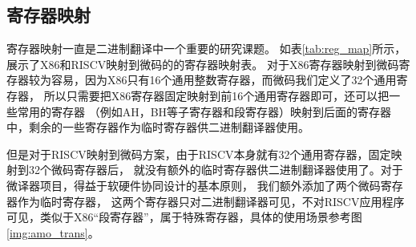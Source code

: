 \subsection{寄存器映射}

寄存器映射一直是二进制翻译中一个重要的研究课题。
如表\ref{tab:reg_map}所示，展示了X86和RISCV映射到微码的的寄存器映射表。
对于X86寄存器映射到微码寄存器较为容易，因为X86只有16个通用整数寄存器，而微码我们定义了32个通用寄存器，
所以只需要把X86寄存器固定映射到前16个通用寄存器即可，还可以把一些常用的寄存器
（例如AH，BH等子寄存器和段寄存器）映射到后面的寄存器中，剩余的一些寄存器作为临时寄存器供二进制翻译器使用。

但是对于RISCV映射到微码方案，由于RISCV本身就有32个通用寄存器，固定映射到32个微码寄存器后，
就没有额外的临时寄存器供二进制翻译器使用了。对于微译器项目，得益于软硬件协同设计的基本原则，
我们额外添加了两个微码寄存器作为临时寄存器，
这两个寄存器只对二进制翻译器可见，不对RISCV应用程序可见，类似于X86“段寄存器”，属于特殊寄存器，具体的使用场景参考图\ref{img:amo_trans}。



